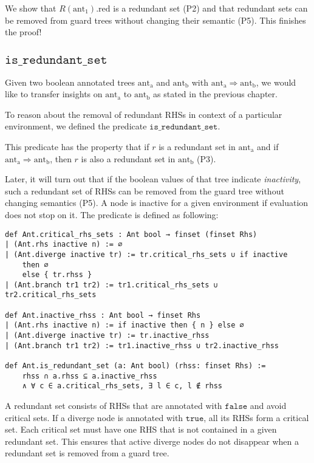 We show that $R(\mathrm{ant_1}).\mathrm{red}$ is a redundant set (P2)
and that redundant sets can be removed from guard trees without changing their semantic (P5).
This finishes the proof!


\subsection{$\mathtt{is\_redundant\_set}$}\label{chap:isRedundantSet}

Given two boolean annotated trees $\mathrm{ant_a}$ and $\mathrm{ant_b}$ with $\mathrm{ant_a} \Rightarrow \mathrm{ant_b}$,
we would like to transfer insights on $\mathrm{ant_a}$ to $\mathrm{ant_b}$ as stated in the previous chapter.

To reason about the removal of redundant RHSs in context of a particular environment,
we defined the predicate $\mathtt{is\_redundant\_set}$.


This predicate has the property that if $r$ is a redundant set in $\mathrm{ant_a}$ and if $\mathrm{ant_a} \Rightarrow \mathrm{ant_b}$,
then $r$ is also a redundant set in $\mathrm{ant_b}$ (P3).

Later, it will turn out that if the boolean values of that tree indicate \textit{inactivity}, such a redundant set of RHSs can be removed from the guard tree without changing semantics (P5). A node is inactive for a given environment if evaluation does not stop on it.
The predicate is defined as following:
\begin{verbatim}
def Ant.critical_rhs_sets : Ant bool → finset (finset Rhs)
| (Ant.rhs inactive n) := ∅
| (Ant.diverge inactive tr) := tr.critical_rhs_sets ∪ if inactive
    then ∅
    else { tr.rhss }
| (Ant.branch tr1 tr2) := tr1.critical_rhs_sets ∪ tr2.critical_rhs_sets

def Ant.inactive_rhss : Ant bool → finset Rhs
| (Ant.rhs inactive n) := if inactive then { n } else ∅
| (Ant.diverge inactive tr) := tr.inactive_rhss
| (Ant.branch tr1 tr2) := tr1.inactive_rhss ∪ tr2.inactive_rhss

def Ant.is_redundant_set (a: Ant bool) (rhss: finset Rhs) :=
    rhss ∩ a.rhss ⊆ a.inactive_rhss
    ∧ ∀ c ∈ a.critical_rhs_sets, ∃ l ∈ c, l ∉ rhss
\end{verbatim}

A redundant set consists of RHSs that are annotated with $\mathtt{false}$ and avoid critical sets.
If a diverge node is annotated with $\mathtt{true}$, all its RHSs form a critical set.
Each critical set must have one RHS that is not contained in a given redundant set.
This ensures that active diverge nodes do not disappear when a redundant set is removed from a guard tree.


